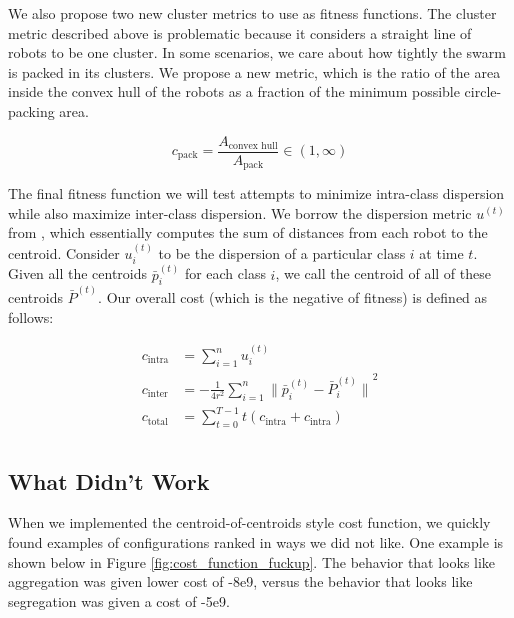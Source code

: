 \documentclass[conference]{IEEEtran}
\begin{document}
  We also propose two new cluster metrics to use as fitness functions. The cluster metric described above is problematic because it considers a straight line of robots to be one cluster. In some scenarios, we care about how tightly the swarm is packed in its clusters. We propose a new metric, which is the ratio of the area inside the convex hull of the robots as a fraction of the minimum possible circle-packing area.

  $$ c_{\text{pack}} = \frac{A_\text{convex hull}}{A_{\text{pack}}} \in (1, \infty) $$

  The final fitness function we will test attempts to minimize intra-class dispersion while also maximize inter-class dispersion. We borrow the dispersion metric $u^{(t)}$ from \cite{gauci_self-organized_2014}, which essentially computes the sum of distances from each robot to the centroid. Consider $u_i^{(t)}$ to be the dispersion of a particular class $i$ at time $t$. Given all the centroids $\bar{p}_i^{(t)}$ for each class $i$, we call the centroid of all of these centroids $\bar{P}^{(t)}$. Our overall cost (which is the negative of fitness) is defined as follows:

  \begin{align*}
  c_{\text{intra}} &= \sum_{i=1}^n u_i^{(t)} \\
  c_{\text{inter}} &= -\frac{1} {4r^2}\sum_{i=1}^n{\lVert \bar{p}_i^{(t)} - \bar{P}_i^{(t)} \rVert}^2 \\
  c_{\text{total}} &=  \sum_{t=0}^{T-1} t (c_{\text{intra}} + c_{\text{intra}}) \\
  \end{align*}


  \subsection{What Didn't Work}

  When we implemented the centroid-of-centroids style cost function, we quickly found examples of configurations ranked in ways we did not like. One example is shown below in Figure \ref{fig:cost_function_fuckup}. The behavior that looks like aggregation was given lower cost of -8e9, versus the behavior that looks like segregation was given a cost of -5e9.
\end{document}
